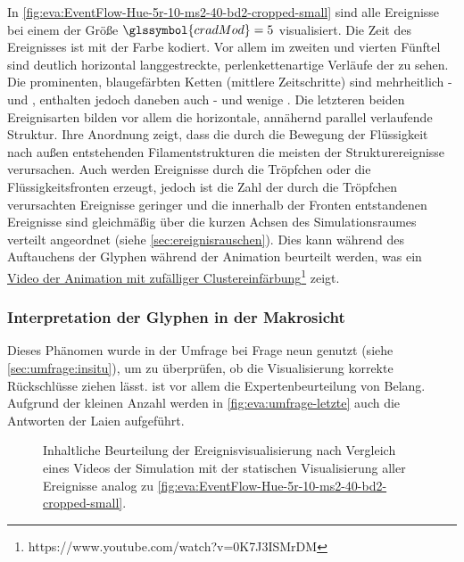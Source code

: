 In \autoref{fig:eva:EventFlow-Hue-5r-10-ms2-40-bd2-cropped-small} sind alle Ereignisse bei einem  der Größe $\glssymbol{cradMod} = 5$ visualisiert. Die Zeit des Ereignisses ist mit der Farbe kodiert. Vor allem im zweiten und vierten Fünftel sind deutlich horizontal langgestreckte, perlenkettenartige Verläufe der  zu sehen. Die prominenten, blaugefärbten Ketten (mittlere Zeitschritte) sind mehrheitlich - und  , enthalten jedoch daneben auch - und wenige . Die letzteren beiden Ereignisarten bilden vor allem die horizontale, annähernd parallel verlaufende Struktur. Ihre Anordnung zeigt, dass die durch die Bewegung der Flüssigkeit nach außen entstehenden Filamentstrukturen die meisten der Strukturereignisse verursachen. Auch werden Ereignisse durch die Tröpfchen oder die Flüssigkeitsfronten erzeugt, jedoch ist die Zahl der durch die Tröpfchen verursachten Ereignisse geringer und die innerhalb der Fronten entstandenen Ereignisse sind gleichmäßig über die kurzen Achsen des Simulationsraumes verteilt angeordnet (siehe \autoref{sec:ereignisrauschen}). Dies kann während des Auftauchens der Glyphen während der Animation beurteilt werden, was ein \href{https://www.youtube.com/watch?v=0K7J3ISMrDM}{Video der Animation mit zufälliger Clustereinfärbung}\footnote{https://www.youtube.com/watch?v=0K7J3ISMrDM} zeigt.

\subsubsection*{Interpretation der Glyphen in der Makrosicht}\label{sec:eva:ereignisse-quali-verlauf:umfrage}
Dieses Phänomen wurde in der Umfrage bei Frage neun genutzt (siehe \autoref{sec:umfrage:insitu}), um zu überprüfen, ob die Visualisierung korrekte Rückschlüsse ziehen lässt. ist vor allem die Expertenbeurteilung von Belang. Aufgrund der kleinen Anzahl werden in \autoref{fig:eva:umfrage-letzte} auch die Antworten der Laien aufgeführt.

\begin{figure}
	{\caption{Inhaltliche Beurteilung der Ereignisvisualisierung nach Vergleich eines Videos der Simulation mit der statischen Visualisierung aller Ereignisse analog zu \autoref{fig:eva:EventFlow-Hue-5r-10-ms2-40-bd2-cropped-small}.}\label{fig:eva:umfrage-letzte}}
\end{figure}

